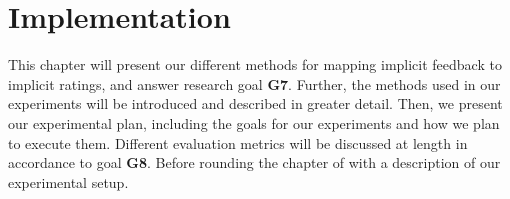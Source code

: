 
\chapter{Implementation}
\label{chap:implementaion}
\minitoc

This chapter will present our different methods for mapping implicit feedback to implicit 
ratings, and answer research goal \textbf{G7}. Further, the methods used in our experiments
will be introduced and described in greater detail. Then, we present our experimental plan,
including the goals for our experiments and how we plan to execute them. Different evaluation
metrics will be discussed at length in accordance to goal \textbf{G8}. Before rounding the chapter
of with a description of our experimental setup.

\clearpage






